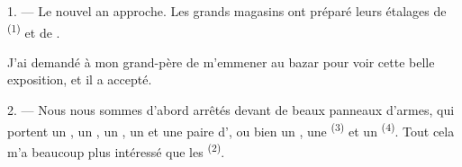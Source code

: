 %
%
%
%

\VUsaut{4.0mm}
\VUsaut{2.0mm}
\VUsaut{3.4mm}

1. --- Le nouvel an approche. Les grands magasins ont préparé leurs étalages de
 \textsuperscript{(1)} et de .

J'ai demandé à mon grand-père de m'emmener au bazar pour voir cette belle
exposition, et il a accepté.

2. --- Nous nous sommes d'abord arrêtés devant de beaux panneaux d'armes, qui
portent un , un , un , un
 et une paire d', ou bien un
, une  \textsuperscript{(3)} et un
 \textsuperscript{(4)}. Tout cela m'a beaucoup plus intéressé que
les  \textsuperscript{(2)}.

